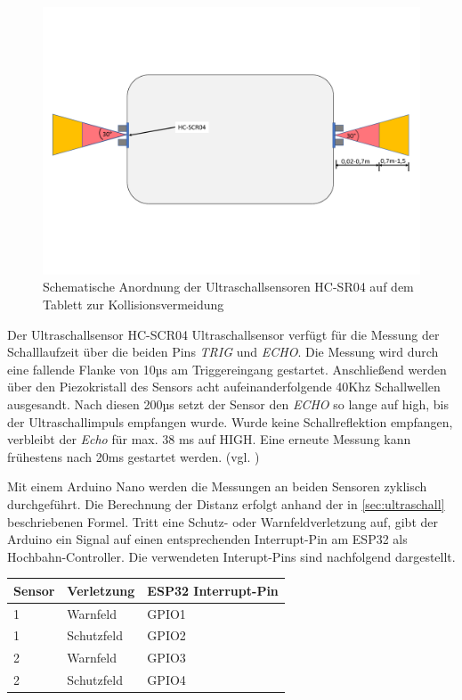 \begin{figure}[h]
	\begin{center}
		\includegraphics[width=15cm]{kollisionsvermeidung.pdf}
		\caption{Schematische Anordnung der Ultraschallsensoren HC-SR04 auf dem Tablett zur Kollisionsvermeidung}
		\label{pic:kollisionsvermeidung}
	\end{center}
\end{figure}

\newpage
Der Ultraschallsensor HC-SCR04 Ultraschallsensor verfügt für die Messung der Schalllaufzeit über die beiden Pins \textit{TRIG} und \textit{ECHO}. Die Messung wird durch eine fallende Flanke von 10µs am Triggereingang gestartet. Anschließend werden über den  Piezokristall des Sensors acht aufeinanderfolgende 40Khz Schallwellen ausgesandt. Nach diesen 200µs setzt der Sensor den \textit{ECHO} so lange auf high, bis der Ultraschallimpuls empfangen wurde. Wurde keine Schallreflektion empfangen, verbleibt der \textit{Echo} für max. 38 ms auf HIGH. Eine erneute Messung kann frühestens nach 20ms gestartet werden. (vgl. \cite{hcrs04})

Mit einem Arduino Nano werden die Messungen an beiden Sensoren zyklisch durchgeführt. Die Berechnung der Distanz erfolgt anhand der in \autoref{sec:ultraschall} beschriebenen Formel. Tritt eine Schutz- oder Warnfeldverletzung auf, gibt der Arduino ein Signal auf einen entsprechenden Interrupt-Pin am ESP32 als  Hochbahn-Controller. Die verwendeten Interupt-Pins sind nachfolgend dargestellt. \\


\begin{center}
	\begin{tabular}[h]{l|l|l}
		Sensor & Verletzung  & ESP32 Interrupt-Pin \\
		\hline
		1 & Warnfeld & GPIO1\\
		\hline
		1 & Schutzfeld & GPIO2\\
		\hline
		2 & Warnfeld & GPIO3\\
		\hline
		2 & Schutzfeld & GPIO4\\	
	\end{tabular}
\end{center}


